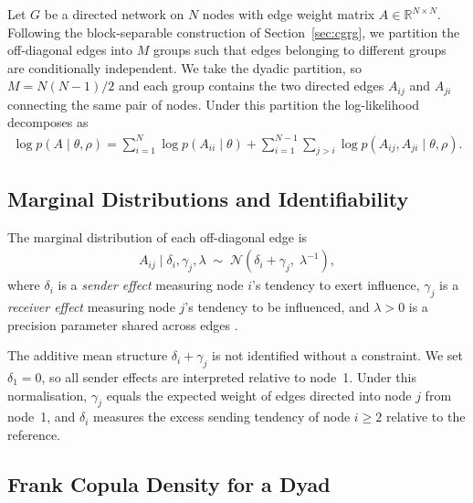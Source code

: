 \documentclass[12pt]{article}
\begin{document}
Let $G$ be a directed network on $N$ nodes with edge weight matrix
$A \in \mathbb{R}^{N \times N}$.  Following the block-separable construction
of Section~\ref{sec:cgrg}, we partition the off-diagonal edges into $M$
groups such that edges belonging to different groups are conditionally
independent.  We take the dyadic partition, so $M = N(N-1)/2$ and each
group contains the two directed edges $A_{ij}$ and $A_{ji}$ connecting the
same pair of nodes.  Under this partition the log-likelihood decomposes as
\begin{align}
\label{eq:real_loglik}
\log p(A \mid \theta, \rho)
  = \sum_{i=1}^{N} \log p(A_{ii} \mid \theta)
  + \sum_{i=1}^{N-1} \sum_{j > i}
    \log p(A_{ij}, A_{ji} \mid \theta, \rho).
\end{align}

\subsection{Marginal Distributions and Identifiability}

The marginal distribution of each off-diagonal edge is
\begin{align}
\label{eq:marginal_rv}
A_{ij} \mid \delta_i, \gamma_j, \lambda
  \;\sim\; \mathcal{N}\!\left(\delta_i + \gamma_j,\; \lambda^{-1}\right),
\end{align}
where $\delta_i$ is a \emph{sender effect} measuring node $i$'s tendency
to exert influence, $\gamma_j$ is a \emph{receiver effect} measuring
node $j$'s tendency to be influenced, and $\lambda > 0$ is a precision
parameter shared across edges \citep{hoff2005}.

The additive mean structure $\delta_i + \gamma_j$ is not identified without
a constraint.  We set $\delta_1 = 0$, so all sender effects are interpreted
relative to node~1.  Under this normalisation, $\gamma_j$ equals the
expected weight of edges directed into node $j$ from node~1, and $\delta_i$
measures the excess sending tendency of node $i \geq 2$ relative to the
reference.

\subsection{Frank Copula Density for a Dyad}
\end{document}
